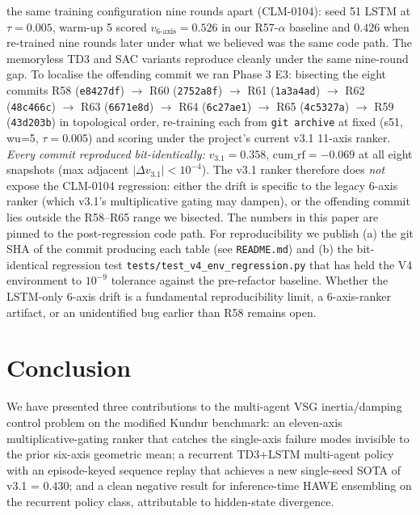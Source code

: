 \documentclass[journal,onecolumn,11pt]{IEEEtran}
\begin{document}
\begin{enumerate}
        the same training configuration nine rounds apart (CLM-0104):
        seed 51 LSTM at $\tau = 0.005$, warm-up 5 scored
        $v_{6\text{-axis}} = 0.526$ in our R57-$\alpha$ baseline and
        $0.426$ when re-trained nine rounds later under what we
        believed was the same code path. The memoryless TD3 and
        SAC variants reproduce cleanly under the same nine-round
        gap. To localise the offending commit we ran Phase 3 E3:
        bisecting the eight commits R58 (\texttt{e8427df}) $\rightarrow$
        R60 (\texttt{2752a8f}) $\rightarrow$ R61 (\texttt{1a3a4ad})
        $\rightarrow$ R62 (\texttt{48c466c}) $\rightarrow$ R63
        (\texttt{6671e8d}) $\rightarrow$ R64 (\texttt{6c27ae1})
        $\rightarrow$ R65 (\texttt{4c5327a}) $\rightarrow$ R59
        (\texttt{43d203b}) in topological order, re-training each
        from \texttt{git archive} at fixed (s51, wu=5, $\tau=$0.005)
        and scoring under the project's current v3.1 11-axis ranker.
        \emph{Every commit reproduced bit-identically: }
        $v_{3.1} = 0.358$, $\text{cum\_rf} = -0.069$ at all eight
        snapshots (max adjacent $|\Delta v_{3.1}| < 10^{-4}$). The
        v3.1 ranker therefore does \emph{not} expose the CLM-0104
        regression: either the drift is specific to the legacy
        6-axis ranker (which v3.1's multiplicative gating may
        dampen), or the offending commit lies outside the R58--R65
        range we bisected. The numbers in this paper are pinned to
        the post-regression code path. For reproducibility we
        publish (a) the git SHA of the commit producing each table
        (see \texttt{README.md}) and (b) the bit-identical
        regression test \texttt{tests/test\_v4\_env\_regression.py}
        that has held the V4 environment to $10^{-9}$ tolerance
        against the pre-refactor baseline. Whether the LSTM-only
        6-axis drift is a fundamental reproducibility limit, a
        6-axis-ranker artifact, or an unidentified bug earlier than
        R58 remains open.
\end{enumerate}

\section{Conclusion}\label{sec:conclusion}

We have presented three contributions to the multi-agent VSG
inertia/damping control problem on the modified Kundur benchmark:
an eleven-axis multiplicative-gating ranker that catches the
single-axis failure modes invisible to the prior six-axis geometric
mean; a recurrent TD3+LSTM multi-agent policy with an episode-keyed
sequence replay that achieves a new single-seed SOTA of v3.1 =
0.430; and a clean negative result for inference-time HAWE
ensembling on the recurrent policy class, attributable to
hidden-state divergence.
\end{document}

